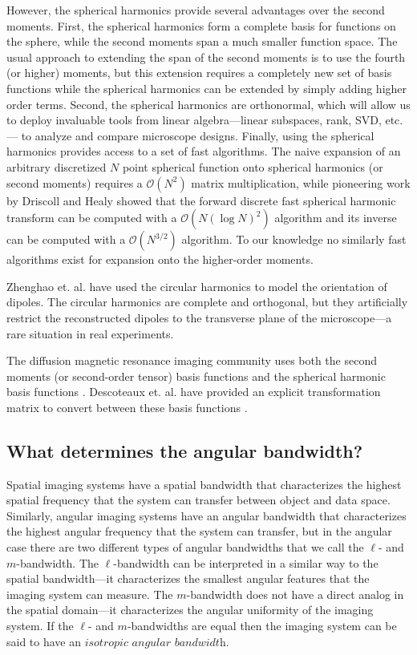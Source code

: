 \documentclass[]{osa-article}
\providecommand{\mc}[1]{\mathcal{#1}}
\begin{document}
However, the spherical harmonics provide several advantages over the second
moments. First, the spherical harmonics form a complete basis for functions on
the sphere, while the second moments span a much smaller function space. The
usual approach to extending the span of the second moments is to use the fourth
(or higher) moments, but this extension requires a completely new set of basis
functions while the spherical harmonics can be extended by simply adding higher
order terms. Second, the spherical harmonics are orthonormal, which will allow
us to deploy invaluable tools from linear algebra---linear subspaces, rank, SVD,
etc.--- to analyze and compare microscope designs. Finally, using the spherical
harmonics provides access to a set of fast algorithms. The naive expansion of an
arbitrary discretized $N$ point spherical function onto spherical harmonics (or
second moments) requires a $\mc{O}(N^2)$ matrix multiplication, while pioneering
work by Driscoll and Healy \cite{driscoll1994} showed that the forward discrete
fast spherical harmonic transform can be computed with a $\mc{O}(N(\log N)^2)$
algorithm and its inverse can be computed with a $\mc{O}(N^{3/2})$ algorithm. To
our knowledge no similarly fast algorithms exist for expansion onto the
higher-order moments.

Zhenghao et. al. \cite{zhanghao2017} have used the circular harmonics to model
the orientation of dipoles. The circular harmonics are complete and orthogonal,
but they artificially restrict the reconstructed dipoles to the transverse
plane of the microscope---a rare situation in real experiments.

The diffusion magnetic resonance imaging community uses both the second moments
(or second-order tensor) basis functions \cite{basser1994} and the spherical
harmonic basis functions \cite{tournier2004}. Descoteaux et. al. have provided
an explicit transformation matrix to convert between these basis functions
\cite{descoteaux2006}.


\subsection{What determines the angular bandwidth?}
Spatial imaging systems have a spatial bandwidth that characterizes the highest
spatial frequency that the system can transfer between object and data space.
Similarly, angular imaging systems have an angular bandwidth that characterizes
the highest angular frequency that the system can transfer, but in the angular case
there are two different types of angular bandwidths that we call the $\ell$- and
$m$-bandwidth. The $\ell$-bandwidth can be interpreted in a similar way to the
spatial bandwidth---it characterizes the smallest angular features that the
imaging system can measure. The $m$-bandwidth does not have a direct analog in
the spatial domain---it characterizes the angular uniformity of the imaging
system. If the $\ell$- and $m$-bandwidths are equal then the imaging system can
be said to have an $\textit{isotropic angular bandwidth}$.
\end{document}
